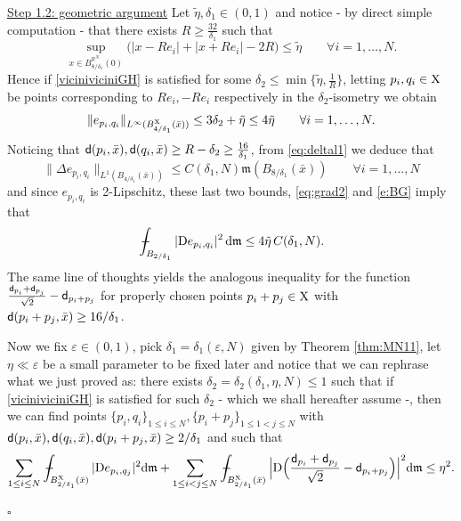 \documentclass[reqno,11pt]{article}
\numberwithin{equation}{section}
\newcommand{\R}{\mathbb{R}}
\newcommand{\mm}{{\mbox{\boldmath$m$}}}
\newcommand{\sfd}{{\sf d}}
\renewcommand{\d}{{\mathrm d}}
\newcommand{\eps}{\varepsilon}
\newcommand{\mean}[1]{\,-\hskip-1.08em\int_{#1}} %
\renewcommand{\mm}{\mathfrak m}                                %
\renewenvironment{proof}{\removelastskip\par\medskip   %
\noindent{\em Proof} \rm}{\penalty-20\null\hfill$\square$\par\medbreak}
\newcommand{\X}{{\rm X}}
\newcommand{\D}{{\rm D}}
\begin{document}
\begin{proof}
    \underline{Step 1.2: geometric argument} Let $\tilde\eta,\delta_1\in(0,1)$ and notice - by direct simple computation - that there exists  $ R\geq \frac{32}{\delta_1} $ such that 
\[
\sup_{x\in B^{\R^N}_{8/\delta_1}(0)}\big(|x-Re_i|+|x+Re_i|-2R\big)\leq   \tilde\eta\qquad\forall i=1,\ldots,N.
\]
Hence if \eqref{viciniviciniGH} is satisfied for some $\delta_2\leq \min\{\tilde\eta,\frac1R\}$, letting $p_i,q_i\in\X$ be points corresponding to $ Re_i,- Re_i$ respectively in the $\delta_2$-isometry we obtain
\[
\|e_{p_i,q_i} \|_{L^\infty(B^{\X}_{{ 4/{\delta_1}}}(\bar x))}\leq 3\delta_2+\tilde\eta\leq 4\tilde\eta\qquad\forall i=1,\ldots,N.
\]
Noticing that $\sfd(p_i,\bar x),\sfd(q_i,\bar x)\geq  R-\delta_2\geq\frac{16}{\delta_1}$, from \eqref{eq:deltal1} we deduce that
\[
\|\Delta e_{p_i,q_i}\|_{L^1(B_{4/{\delta_1}}(\bar x))}\leq C(\delta_1,N)\mm(B_{8/\delta_1}(\bar x))\qquad\forall i=1,\ldots,N
\]
and since  $e_{p_i,q_i}$ is 2-Lipschitz, these last two bounds, \eqref{eq:grad2} and \eqref{e:BG} imply  that
\[
\mean{B_{ 2/\delta_1}}|\D e_{p_i,q_i}|^2\,\d\mm\leq  4\tilde\eta\, C(\delta_1,N).
\]
The same line of thoughts yields the analogous inequality for the function $\frac{\sfd_{p_i}+\sfd_{p_j}}{\sqrt 2}-\sfd_{p_i+p_j}$ for properly chosen points $p_i+p_j\in\X$ with $\sfd(p_i+p_j,\bar x)\geq 16/\delta_1$.

Now we fix $\eps\in(0,1)$, pick $\delta_1=\delta_1(\eps,N)$ given by Theorem \ref{thm:MN11}, let $\eta\ll\eps$ be a small parameter to be fixed later and notice that  we can rephrase what we just proved as:  there exists $\delta_2=\delta_2(\delta_1,\eta,N)\leq 1$ such that if \eqref{viciniviciniGH} is satisfied for such $\delta_2$ - which we shall hereafter assume -, then we can find points \(\{p_i, q_i\}_{1\le i\le N}, \{p_i+p_j\}_{1\le 1<j\le N}\) with \(\sfd(p_i,\bar x), \sfd(q_i,\bar x), \sfd(p_i+p_j,\bar x)\ge 2/\delta_1\) and such that
\begin{equation}\label{eq:quasi22} 
\sum_{1\le i\le N} \mean{B^\X_{2/\delta_1}(\bar x)} | \D e_{p_i,q_j} |^2\d \mm+\sum_{1\le i<j\le N} \mean {B^\X_{2/\delta_1}(\bar x)}\Big| \D\Big(\frac{\sfd_{p_i}+\sfd_{p_j}}{\sqrt 2}-\sfd_{p_i+p_j}\Big)\Big|^2\d \mm\le \eta^2.
\end{equation} 


\end{proof}
\end{document}
